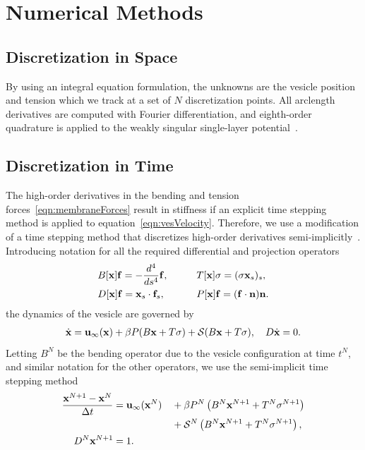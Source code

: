 \documentclass[9pt,twocolumn,twoside,lineno]{pnas-new}
\begin{document}
\section*{Numerical Methods}

\subsection*{Discretization in Space}
By using an integral equation formulation, the unknowns are the vesicle
position and tension which we track at a set of $N$ discretization
points. All arclength derivatives are computed with Fourier
differentiation, and eighth-order quadrature is applied to the weakly
singular single-layer potential~\cite{alp1999}.

\subsection*{Discretization in Time}
The high-order derivatives in the bending and tension
forces~\eqref{eqn:membraneForces} result in stiffness if an explicit
time stepping method is applied to equation~\eqref{eqn:vesVelocity}.
Therefore, we use a modification of a time stepping method that
discretizes high-order derivatives
semi-implicitly~\cite{vee-gue-zor-bir2009}. Introducing notation for
all the required differential and projection operators
\begin{alignat}{3}
  &B[\mathbf{x}]\mathbf{f} = -\frac{d^4}{ds^4} \mathbf{f},  \qquad
  &&T[\mathbf{x}]\sigma = (\sigma \mathbf{x}_s)_s, \\
  &D[\mathbf{x}]\mathbf{f} = \mathbf{x}_s \cdot \mathbf{f}_s, 
  &&P[\mathbf{x}]\mathbf{f} = (\mathbf{f} \cdot \mathbf{n}) \mathbf{n}. 
\end{alignat}
the dynamics of the vesicle are governed by
\begin{align}
  \dot{\mathbf{x}} = \mathbf{u}_{\infty}(\mathbf{x}) + 
  \beta P(B\mathbf{x} + T\sigma) + \mathcal{S}(B\mathbf{x} + T\sigma), \quad
  D \dot{\mathbf{x}} = 0.
\end{align}
Letting $B^N$ be the bending operator due to the vesicle
configuration at time $t^N$, and similar notation for the other
operators, we use the semi-implicit time stepping method
\begin{alignat}{3}  
  \frac{\mathbf{x}^{N+1} - \mathbf{x}^N}{\Delta t} &= \mathbf{u}_\infty(\mathbf{x}^N) 
  &&+ \beta P^N\left(B^N\mathbf{x}^{N+1} + T^N\sigma^{N+1}\right) \nonumber \\
  & &&+ \mathcal{S}^N\left(B^N\mathbf{x}^{N+1} + T^N\sigma^{N+1}\right), \\
  D^N\mathbf{x}^{N+1} &= 1.
\end{alignat}
\end{document}
